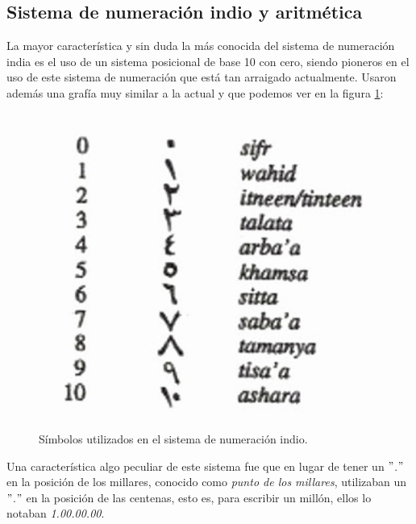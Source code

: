 \documentclass[a4paper, 11pt]{article}
\begin{document}
	\subsection{Sistema de numeración indio y aritmética}
		La mayor característica y sin duda la más conocida del sistema de numeración india es el uso de un sistema posicional
		de base 10 con cero, siendo pioneros en el uso de este sistema de numeración que está tan arraigado actualmente.
		Usaron además una grafía muy similar a la actual y que podemos ver en la figura \ref{fig:ind_numbers}:
		\begin{figure}[!ht]
			\centering
			\includegraphics[width = 14cm]{indian_numbers.jpg}
			\caption{Símbolos utilizados en el sistema de numeración indio.}
			\label{fig:ind_numbers}
		\end{figure}

		Una característica algo peculiar de este sistema fue que en lugar de tener un $"$.$"$ en la posición de los millares,
		conocido como \textit{punto de los millares}, utilizaban un $"$.$"$ en la posición de las centenas, esto es, para
		escribir un millón, ellos lo notaban \textit{1.00.00.00}.
\end{document}
